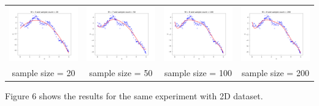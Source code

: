 \documentclass[11pt]{article}
\begin{document}
\begin{center}
\setlength\tabcolsep{0pt}
\begin{tabular}{cccc}
\includegraphics[width=5cm]{regression/1d-complex-20-dev-fig.png}
& \includegraphics[width=5cm]{regression/1d-complex-50-dev-fig.png}
& \includegraphics[width=5cm]{regression/1d-complex-100-dev-fig.png}
& \includegraphics[width=5cm]{regression/1d-complex-200-dev-fig.png}\\
sample size = 20 & sample size = 50
& sample size = 100 & sample size = 200 \\
\end{tabular}
\end{center}

Figure 6 shows the results for the same experiment with 2D dataset.
\end{document}
